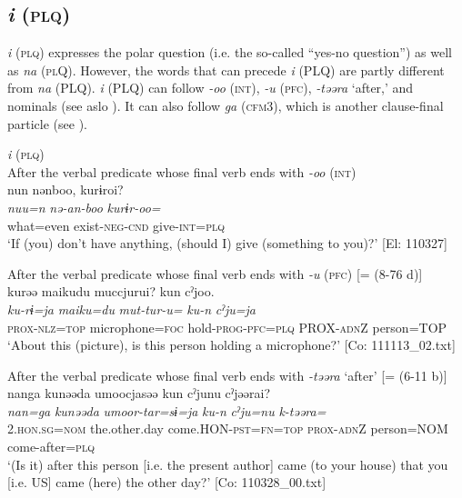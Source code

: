 \subsection{\textit{i} (\textsc{plq})}\label{sec:10.3.3}

\textit{i} (\textsc{plq}) expresses the polar question (i.e. the so-called “yes-no question”) as well as \textit{na} (\textsc{pl}Q). However, the words that can precede \textit{i} (PLQ) are partly different from \textit{na} (PLQ). \textit{i} (PLQ) can follow \textit{{}-oo} (\textsc{int}), \textit{{}-u} (\textsc{pfc}), \textit{{}-təəra} ‘after,’ and nominals (see aslo ). It can also follow \textit{ga} (\textsc{cfm}3), which is another clause-final particle (see ).

\ea\label{ex:10.45}   \textit{i} (\textsc{plq})\\
  \ea After the verbal predicate whose final verb ends with \textit{-oo} (\textsc{int})\\
      \glll    nun  nənboo,  kurɨroi?\\
    \textit{nuu=n}  \textit{nə-an-boo}  \textit{kurɨr-oo=}\\
    what=even  exist-\textsc{neg}-\textsc{cnd}  give-\textsc{int}=\textsc{plq}\\
    \glt     ‘If (you) don’t have anything, (should I) give (something to you)?’ [El: 110327]

  \ex After the verbal predicate whose final verb ends with \textit{-u} (\textsc{pfc}) [= (8-76 d)]\\
      \glll    kurəə  {\textbar}maiku{\textbar}du  muccjurui? kun  cˀjoo.\\                                                               
    \textit{ku-rɨ=ja}  \textit{maiku=du}  \textit{mut-tur-u=}  \textit{ku-n}  \textit{cˀju=ja}\\                                                               
    \textsc{prox}-\textsc{nlz}=\textsc{top}  microphone=\textsc{foc}  hold-\textsc{prog}-\textsc{pfc}=\textsc{plq}  PROX-\textsc{adn}Z  person=TOP \\
    \glt ‘About this (picture), is this person holding a microphone?’ [Co: 111113\_02.txt]

  \ex After the verbal predicate whose final verb ends with \textit{{}-təəra} ‘after’ [= (6-11 b)]\\
      \glll    nanga  kunəəda  umoocjasəə  kun   cˀjunu  cˀjəərai?\\
    \textit{nan=ga}  \textit{kunəəda}  \textit{umoor-tar=sɨ=ja}  \textit{ku-n}  \textit{cˀju=nu}  \textit{k-təəra=}\\
    2.\textsc{hon}.\textsc{sg}=\textsc{nom}  the.other.day  come.HON-\textsc{pst}=\textsc{fn}=\textsc{top}  \textsc{prox}-\textsc{adn}Z   person=NOM  come-after=\textsc{plq}\\
\glt     ‘(Is it) after this person [i.e. the present author] came (to your house) that you [i.e. US] came (here) the other day?’  [Co: 110328\_00.txt]

